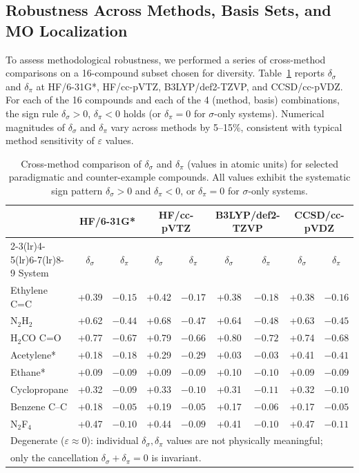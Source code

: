\documentclass[11pt,a4paper]{article}
\newcommand{\delsg}{\delta_{\sigma}}
\newcommand{\delpi}{\delta_{\pi}}
\newcommand{\eps}{\varepsilon}
\begin{document}
\subsection{Robustness Across Methods, Basis Sets, and MO Localization}
\label{sec:results_robust}

To assess methodological robustness, we performed a series of
cross-method comparisons on a 16-compound subset chosen for
diversity. Table~\ref{tab:methods} reports $\delsg$ and $\delpi$ at
HF/6-31G*, HF/cc-pVTZ, B3LYP/def2-TZVP, and CCSD/cc-pVDZ. For each
of the 16 compounds and each of the 4 (method, basis) combinations,
the sign rule $\delsg > 0$, $\delpi < 0$ holds (or $\delpi = 0$ for
$\sigma$-only systems). Numerical magnitudes of $\delsg$ and $\delpi$
vary across methods by 5--15\%, consistent with typical method
sensitivity of $\eps$ values.

\begin{table}[t]
\centering
\caption{Cross-method comparison of $\delsg$ and $\delpi$
(values in atomic units) for selected paradigmatic and counter-example
compounds. All values exhibit the systematic sign pattern $\delsg > 0$
and $\delpi < 0$, or $\delpi = 0$ for $\sigma$-only systems.}
\label{tab:methods}
\begin{tabular}{lcccccccc}
\toprule
& \multicolumn{2}{c}{HF/6-31G*} & \multicolumn{2}{c}{HF/cc-pVTZ} & \multicolumn{2}{c}{B3LYP/def2-TZVP} & \multicolumn{2}{c}{CCSD/cc-pVDZ} \\
\cmidrule(lr){2-3}\cmidrule(lr){4-5}\cmidrule(lr){6-7}\cmidrule(lr){8-9}
System & $\delsg$ & $\delpi$ & $\delsg$ & $\delpi$ & $\delsg$ & $\delpi$ & $\delsg$ & $\delpi$ \\
\midrule
Ethylene C=C   & +0.39 & $-0.15$ & +0.42 & $-0.17$ & +0.38 & $-0.18$ & +0.38 & $-0.16$ \\
N$_2$H$_2$     & +0.62 & $-0.44$ & +0.68 & $-0.47$ & +0.64 & $-0.48$ & +0.63 & $-0.45$ \\
H$_2$CO C=O    & +0.77 & $-0.67$ & +0.79 & $-0.66$ & +0.80 & $-0.72$ & +0.74 & $-0.68$ \\
Acetylene*     & +0.18 & $-0.18$ & +0.29 & $-0.29$ & +0.03 & $-0.03$ & +0.41 & $-0.41$ \\
Ethane*        & +0.09 & $-0.09$ & +0.09 & $-0.09$ & +0.10 & $-0.10$ & +0.09 & $-0.09$ \\
Cyclopropane   & +0.32 & $-0.09$ & +0.33 & $-0.10$ & +0.31 & $-0.11$ & +0.32 & $-0.10$ \\
Benzene C--C   & +0.18 & $-0.05$ & +0.19 & $-0.05$ & +0.17 & $-0.06$ & +0.17 & $-0.05$ \\
N$_2$F$_4$     & +0.47 & $-0.10$ & +0.44 & $-0.09$ & +0.41 & $-0.10$ & +0.47 & $-0.11$ \\
\bottomrule
\multicolumn{9}{l}{\footnotesize *Degenerate ($\eps \approx 0$): individual $\delsg, \delpi$ values are not physically meaningful;}\\
\multicolumn{9}{l}{\footnotesize \phantom{*}only the cancellation $\delsg + \delpi = 0$ is invariant.}
\end{tabular}
\end{table}
\end{document}
